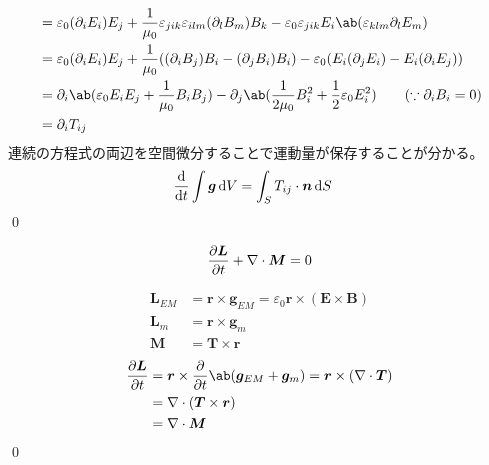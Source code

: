 \documentclass[uplatex,dvipdfmx,a4paper,11pt]{jlreq}
\makeatletter
\newcommand{\EE}{\bm{E}}
\newcommand{\BB}{\bm{B}}
\newcommand{\MM}{\bm{M}}
\newcommand{\rr}{\bm{r}}
\newcommand{\vnabla}{\mathbf{\nabla}}
\numberwithin{equation}{section}
\theoremstyle{definition}
\renewenvironment{proof}[1][\proofname]{\par
  \normalfont
  \topsep6\p@\@plus6\p@ \trivlist
  \item[\hskip\labelsep{\bfseries #1}\@addpunct{\bfseries}]\ignorespaces\quad\par
}{%
  \qed\endtrivlist\@endpefalse
}
\renewcommand\proofname{証明}
\makeatother
\begin{document}
\begin{proof}
\begin{align}
                   & = \varepsilon_0(\partial_iE_i)E_j + \frac{1}{\mu_0}\varepsilon_{jik}\varepsilon_{ilm}(\partial_lB_m)B_k - \varepsilon_0\varepsilon_{jik}E_i\ab(\varepsilon_{klm}\partial_lE_m)                                      \\
                   & = \varepsilon_0(\partial_iE_i)E_j + \frac{1}{\mu_0}((\partial_iB_j)B_i - (\partial_jB_i)B_i) - \varepsilon_0(E_i(\partial_jE_i) - E_i(\partial_iE_j))                                                               \\
                   & = \partial_i\ab(\varepsilon_0E_iE_j + \frac{1}{\mu_0}B_iB_j) - \partial_j\ab(\frac{1}{2\mu_0}B_i^2 + \frac{1}{2}\varepsilon_0E_i^2) \qquad (\because\partial_iB_i = 0)                                              \\
                   & = \partial_iT_{ij}
  \end{align}
  連続の方程式の両辺を空間微分することで運動量が保存することが分かる。
  \begin{align}
    \diff{}{t}\int \bm{g}\dl{V} & = \int_ST_{ij}\cdot\bm{n}\dl{S}
  \end{align}
\end{proof}

\begin{theorem}[角運動量保存則]
  \begin{align}
    \diffp{\bm{L}}{t} + \vnabla\cdot\MM = 0
  \end{align}
\end{theorem}
\begin{proof}
  \begin{align}
    \bm{L}_{EM} & = \rr\times\bm{g}_{EM} = \varepsilon_0\rr\times(\EE\times\BB) \\
    \bm{L}_m    & = \rr\times\bm{g}_m                                           \\
    \MM         & = \bm{T} \times \rr
  \end{align}
  \begin{align}
    \diffp{\bm{L}}{t} & = \rr\times\diffp{}{t}\ab(\bm{g}_{EM} + \bm{g}_m) = \rr\times(\vnabla\cdot\bm{T}) \\
                      & = \vnabla\cdot(\bm{T}\times\rr)                                                   \\
                      & = \vnabla\cdot\MM
  \end{align}
\end{proof}
\end{document}
